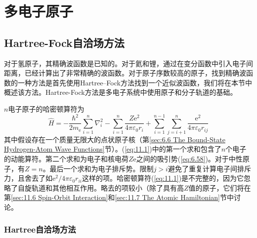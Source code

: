\chapter{多电子原子}
\label{chap:11}
\section{Hartree-Fock自洽场方法}
\label{sec:11.1 The Hartree-Fock Self-Consistent-Field Method}

    对于氢原子，其精确波函数是已知的。对于氦和锂，通过在变分函数中引入电子间距离，已经计算出了非常精确的波函数。对于原子序数较高的原子，找到精确波函数的一种方法是首先使用Hartree–Fock方法找到一个近似波函数，我们将在本节中概述该方法。Hartree-Fock方法是多电子系统中使用原子和分子轨道的基础。

    $n$电子原子的哈密顿算符为
    \begin{equation}
        \hat{H} = -\frac{\hbar^2}{2m_{\mathrm{e}}} \sum_{i=1}^{n} \nabla_i^2 - \sum_{i=1}^{n} \frac{Z \mathrm{e}^2}{4\pi\varepsilon_0 r_i} + \sum_{i=1}^{n-1} \sum_{j=i+1}^{n} \frac{\mathrm{e}^2}{4\pi\varepsilon_0 r_{ij}}
        \label{eq:11.1}
    \end{equation}
    其中假设存在一个质量无限大的点状原子核（第\ref{sec:6.6 The Bound-State Hydrogen-Atom Wave Functions}节）。(\ref{eq:11.1})中的第一个求和包含了$n$个电子的动能算符。第二个求和为电子和核电荷$Z\mathrm{e}$之间的吸引势(\ref{eq:6.58})。对于中性原子，有$Z=n$。最后一个求和为电子排斥势。限制$j > i$避免了重复计算电子间排斥力，且舍去了如$\mathrm{e}^2/4\pi\varepsilon_0 r_{ii}$这样的项。哈密顿算符(\ref{eq:11.1})是不完整的，因为它忽略了自旋轨道和其他相互作用。略去的项较小（除了具有高$Z$值的原子，它们将在第\ref{sec:11.6 Spin-Orbit Interaction}和\ref{sec:11.7 The Atomic Hamiltonian}节中讨论。

\subsection*{Hartree自洽场方法}

